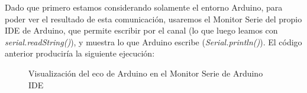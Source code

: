 Dado que primero estamos considerando solamente el entorno Arduino, para poder ver el resultado de esta comunicación, usaremos el Monitor Serie del propio IDE de Arduino, que permite escribir por el canal (lo que luego leamos con \textit{serial.readString()}), y muestra lo que Arduino escribe (\textit{Serial.println()}). El código anterior produciría la siguiente ejecución:
\begin{figure}[h]
\centering	
\begin{subfigure}
	[Escribir el String que Arduino lee del canal]{
		\texttt{[image: MonitorEnviar.png]}
		\label{img:ComunicacionArduinoEnviar}}
\end{subfigure}
\begin{subfigure}
	[Muestra el String que Arduino ha escrito en el canal]{
		\texttt{[image: MonitorRespuesta.png]}
		\label{img:ComunicacionArduinoLeer}}
\end{subfigure}
\label{img:ComunicacionArduinoMonitorSerie}
\caption{Visualización del eco de Arduino en el Monitor Serie de Arduino IDE}
\end{figure}

